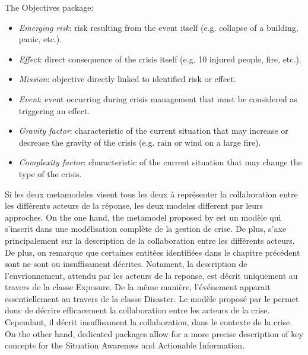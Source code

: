 The Objectives package:
\begin{itemize}
    \item \textit{Emerging risk}: risk resulting from the event itself (e.g. collapse of a building, panic, etc.).
    \item \textit{Effect}: direct consequence of the crisis itself (e.g. 10 injured people, fire, etc.).
    \item \textit{Mission}: objective directly linked to identified risk or effect.
    \item \textit{Event}: event occurring during crisis management that must be considered as triggering an effect.
    \item \textit{Gravity factor}: characteristic of the current situation that may increase or decrease the gravity of the crisis (e.g. rain or wind on a large fire).
    \item \textit{Complexity factor}: characteristic of the current situation that may change the type of the crisis.
\end{itemize}

Si les deux metamodeles visent tous les deux à représenter la collaboration entre les différents acteurs de la réponse, les deux modeles different par leurs approches.
On the one hand, the metamodel proposed by \textcite{othmanDevelopmentValidationDisaster2014} est un modèle qui s'inscrit dans une modélisation complète de la gestion de crise.
De plus, s'axe principalement sur la description de la collaboration entre les différents acteurs.
De plus, on remarque que certaines entitées identifiées dans le chapitre précédent sont ne sont ou insuffisament décrites.
Notament, la description de l'envrionnement, attendu par les acteurs de la reponse, est décrit uniquement au travers de la classe Exposure.
De la même manière, l'événement apparait essentiellement au travers de la classe Disaster.
Le modèle proposé par le \textcite{othmanDevelopmentValidationDisaster2014} permet donc de décrire efficacement la collaboration entre les acteurs de la crise.
Cependant, il décrit insuffisament la collaboration, dans le contexte de la crise.
On the other hand, \textcite{benabenMetamodelKnowledgeManagement2016} dedicated packages allow for a more precise description of key concepts for the Situation Awareness and Actionable Information.


